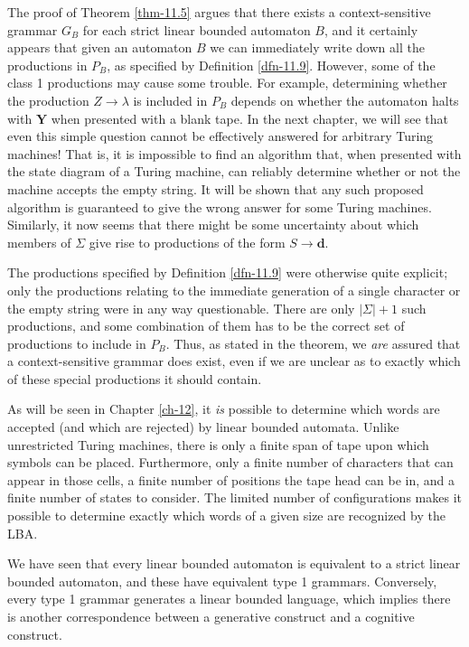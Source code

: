 The proof of Theorem \ref{thm-11.5} argues that there exists a context-sensitive grammar
$G_B$ for each strict linear bounded automaton $B$, and it certainly appears
that given an automaton $B$ we can immediately write down all the productions in
$P_B$, as specified by Definition \ref{dfn-11.9}. However, some of the class 1 productions
may cause some trouble. For example, determining whether the production $Z
\rightarrow\lambda$ is included in $P_B$ depends on whether the automaton halts
with $\pmb{Y}$ when presented with a blank tape. In the next chapter, we will
see that even this simple question cannot be effectively answered for arbitrary
Turing machines! That is, it is impossible to find an algorithm that, when
presented with the state diagram of a Turing machine, can reliably determine
whether or not the machine accepts the empty string. It will be shown that any
such proposed algorithm is guaranteed to give the wrong answer for some Turing
machines. Similarly, it now seems that there might be some uncertainty about
which members of $\Sigma$ give rise to productions of the form $S\rightarrow
\pmb{d}$.

The productions specified by Definition \ref{dfn-11.9} were otherwise quite explicit; only
the productions relating to the immediate generation of a single character or
the empty string were in any way questionable. There are only $|\Sigma|+1$ such
productions, and some combination of them has to be the correct set of
productions to include in $P_B$. Thus, as stated in the theorem, we \emph{are}
assured that a context-sensitive grammar does exist, even if we are unclear as
to exactly which of these special productions it should contain.

As will be seen in Chapter \ref{ch-12}, it \emph{is} possible to determine which words
are accepted (and which are rejected) by linear bounded automata. Unlike
unrestricted Turing machines, there is only a finite span of tape upon which
symbols can be placed. Furthermore, only a finite number of characters
that can appear in those cells, a finite number of positions the tape head can
be in, and a finite number of states to consider. The limited number of
configurations makes it possible to determine exactly which words of a given
size are recognized by the LBA.

We have seen that every linear bounded automaton is equivalent to a strict
linear bounded automaton, and these have equivalent type 1 grammars. Conversely,
every type 1 grammar generates a linear bounded language, which implies there is
another correspondence between a generative construct and a cognitive construct.

